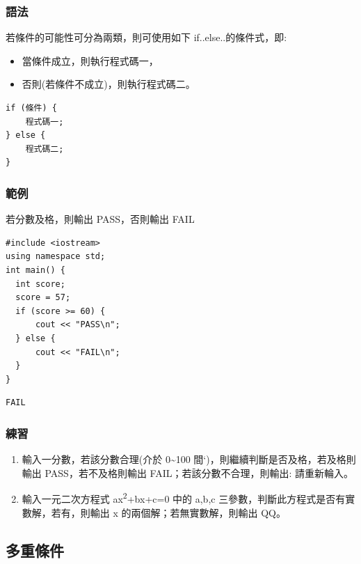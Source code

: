 \documentclass[12pt,a4paper]{article}
\begin{document}
\subsubsection{語法}
\label{sec:orgddf2546}
若條件的可能性可分為兩類，則可使用如下 if..else..的條件式，即:
\begin{itemize}
\item 當條件成立，則執行程式碼一，
\item 否則(若條件不成立)，則執行程式碼二。
\end{itemize}
\lstset{breaklines=true,language=cpp,label= ,caption= ,captionpos=b,numbers=none}
\begin{lstlisting}
if (條件) {
    程式碼一;
} else {
    程式碼二;
}
\end{lstlisting}

\subsubsection{範例}
\label{sec:org1f757eb}
若分數及格，則輸出 PASS，否則輸出 FAIL
\lstset{breaklines=true,language=cpp,label= ,caption= ,captionpos=b,firstnumber=1,numbers=left}
\begin{lstlisting}
#include <iostream>
using namespace std;
int main() {
  int score;
  score = 57;
  if (score >= 60) {
      cout << "PASS\n";
  } else {
      cout << "FAIL\n";
  }
}
\end{lstlisting}

\begin{verbatim}
FAIL
\end{verbatim}
\subsubsection{練習}
\label{sec:orgf8aa5e2}
\begin{enumerate}
\item 輸入一分數，若該分數合理(介於 0\textasciitilde{}100 間`)，則繼續判斷是否及格，若及格則輸出 PASS，若不及格則輸出 FAIL；若該分數不合理，則輸出: 請重新輪入。
\item 輸入一元二次方程式 ax\textsuperscript{2}+bx+c=0 中的 a,b,c 三參數，判斷此方程式是否有實數解，若有，則輸出 x 的兩個解；若無實數解，則輸出 QQ。
\end{enumerate}

\subsection{多重條件}
\label{cpp_multi_conditions}
\end{document}
